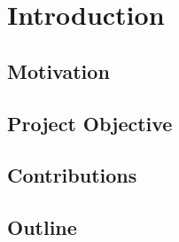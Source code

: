 \chapter{Introduction}

\section{Motivation}

\section{Project Objective}

\section{Contributions}

\section{Outline}
